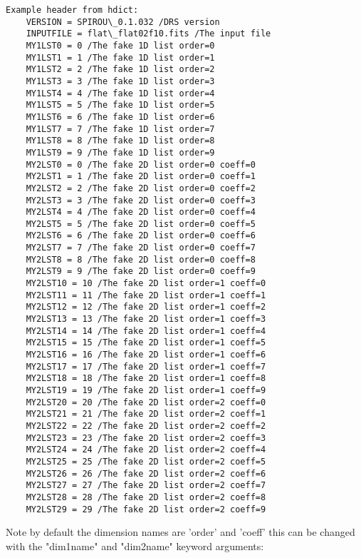 \documentclass[11pt]{article}
\begin{document}
    \begin{Verbatim}[commandchars=\\\{\}]
Example header from hdict: 
	VERSION = SPIROU\_0.1.032 /DRS version
	INPUTFILE = flat\_flat02f10.fits /The input file
	MY1LST0 = 0 /The fake 1D list order=0
	MY1LST1 = 1 /The fake 1D list order=1
	MY1LST2 = 2 /The fake 1D list order=2
	MY1LST3 = 3 /The fake 1D list order=3
	MY1LST4 = 4 /The fake 1D list order=4
	MY1LST5 = 5 /The fake 1D list order=5
	MY1LST6 = 6 /The fake 1D list order=6
	MY1LST7 = 7 /The fake 1D list order=7
	MY1LST8 = 8 /The fake 1D list order=8
	MY1LST9 = 9 /The fake 1D list order=9
	MY2LST0 = 0 /The fake 2D list order=0 coeff=0
	MY2LST1 = 1 /The fake 2D list order=0 coeff=1
	MY2LST2 = 2 /The fake 2D list order=0 coeff=2
	MY2LST3 = 3 /The fake 2D list order=0 coeff=3
	MY2LST4 = 4 /The fake 2D list order=0 coeff=4
	MY2LST5 = 5 /The fake 2D list order=0 coeff=5
	MY2LST6 = 6 /The fake 2D list order=0 coeff=6
	MY2LST7 = 7 /The fake 2D list order=0 coeff=7
	MY2LST8 = 8 /The fake 2D list order=0 coeff=8
	MY2LST9 = 9 /The fake 2D list order=0 coeff=9
	MY2LST10 = 10 /The fake 2D list order=1 coeff=0
	MY2LST11 = 11 /The fake 2D list order=1 coeff=1
	MY2LST12 = 12 /The fake 2D list order=1 coeff=2
	MY2LST13 = 13 /The fake 2D list order=1 coeff=3
	MY2LST14 = 14 /The fake 2D list order=1 coeff=4
	MY2LST15 = 15 /The fake 2D list order=1 coeff=5
	MY2LST16 = 16 /The fake 2D list order=1 coeff=6
	MY2LST17 = 17 /The fake 2D list order=1 coeff=7
	MY2LST18 = 18 /The fake 2D list order=1 coeff=8
	MY2LST19 = 19 /The fake 2D list order=1 coeff=9
	MY2LST20 = 20 /The fake 2D list order=2 coeff=0
	MY2LST21 = 21 /The fake 2D list order=2 coeff=1
	MY2LST22 = 22 /The fake 2D list order=2 coeff=2
	MY2LST23 = 23 /The fake 2D list order=2 coeff=3
	MY2LST24 = 24 /The fake 2D list order=2 coeff=4
	MY2LST25 = 25 /The fake 2D list order=2 coeff=5
	MY2LST26 = 26 /The fake 2D list order=2 coeff=6
	MY2LST27 = 27 /The fake 2D list order=2 coeff=7
	MY2LST28 = 28 /The fake 2D list order=2 coeff=8
	MY2LST29 = 29 /The fake 2D list order=2 coeff=9

    \end{Verbatim}

    Note by default the dimension names are 'order' and 'coeff' this can be
changed with the "dim1name" and "dim2name" keyword arguments:
\end{document}
